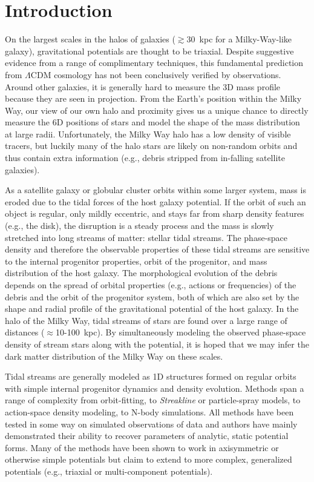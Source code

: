 \documentclass[letterpaper,12pt,preprint]{aastex}
\begin{document}
\keywords{
}

\section{Introduction}\label{sec:introduction}

On the largest scales in the halos of galaxies ($\gtrsim$30~kpc for a Milky-Way-like galaxy), gravitational potentials are thought to be triaxial. Despite suggestive evidence from a range of complimentary techniques, this fundamental prediction from $\Lambda$CDM cosmology has not been conclusively verified by observations. Around other galaxies, it is generally hard to measure the 3D mass profile because they are seen in projection. From the Earth's position within the Milky Way, our view of our own halo and proximity gives us a unique chance to directly measure the 6D positions of stars and model the shape of the mass distribution at large radii. Unfortunately, the Milky Way halo has a low density of visible tracers, but luckily many of the halo stars are likely on non-random orbits and thus contain extra information (e.g., debris stripped from in-falling satellite galaxies).

As a satellite galaxy or globular cluster orbits within some larger system, mass is eroded due to the tidal forces of the host galaxy potential. If the orbit of such an object is regular, only mildly eccentric, and stays far from sharp density features (e.g., the disk), the disruption is a steady process and the mass is slowly stretched into long streams of matter: stellar tidal streams. The phase-space density and therefore the observable properties of these tidal streams are sensitive to the internal progenitor properties, orbit of the progenitor, and  mass distribution of the host galaxy. The morphological evolution of the debris depends on the spread of orbital properties (e.g., actions or frequencies) of the debris and the orbit of the progenitor system, both of which are also set by the shape and radial profile of the gravitational potential of the host galaxy. In the halo of the Milky Way, tidal streams of stars are found over a large range of distances ($\approx$10-100~kpc). By simultaneously modeling the observed phase-space density of stream stars along with the potential, it is hoped that we may infer the dark matter distribution of the Milky Way on these scales.

Tidal streams are generally modeled as 1D structures formed on regular orbits with simple internal progenitor dynamics and density evolution. Methods span a range of complexity from orbit-fitting, to \emph{Streakline} or particle-spray models, to action-space density modeling, to N-body simulations. All methods have been tested in some way on simulated observations of data and authors have mainly demonstrated their ability to recover parameters of analytic, static potential forms. Many of the methods have been shown to work in axisymmetric or otherwise simple potentials but claim to extend to more complex, generalized potentials (e.g., triaxial or multi-component potentials). 
\end{document}
